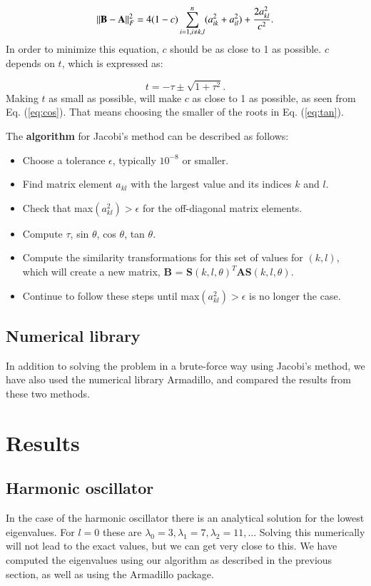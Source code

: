 \documentclass{article}
\begin{document}
\begin{multicols}{2}
\begin{equation*}
	||{\bf B}-{\bf A}||_F^2=4(1-c)\sum_{i=1,i\ne k,l}^n(a_{ik}^2+a_{il}^2) +\frac{2a_{kl}^2}{c^2}.
\end{equation*}
In order to minimize this equation, $c$ should be as close to 1 as possible. $c$ depends on $t$, which is expressed as: 

\begin{equation}\label{eq:tan}
	t = -\tau \pm \sqrt{1+\tau^2}.
\end{equation}
Making $t$ as small as possible, will make $c$ as close to 1 as possible, as seen from Eq. (\ref{eq:cos}). That means choosing the smaller of the roots in Eq. (\ref{eq:tan}).

The \textbf{algorithm} for Jacobi's method can be described as follows: 

\begin{itemize}
	\item Choose a tolerance $\epsilon$, typically $10^{-8}$ or smaller.
	\item Find matrix element $a_{kl}$ with the largest value and its indices $k$ and $l$.
	\item Check that max$(a_{kl}^2) > \epsilon$ for the off-diagonal matrix elements.
	\item Compute $\tau$, sin $\theta$, cos $\theta$, tan $\theta$.
	\item Compute the similarity transformations for this set of values for $(k,l)$, which will create a new matrix, \textbf{B} = \textbf{S}$(k,l,\theta)^T$\textbf{A}\textbf{S}$(k,l,\theta)$.
	\item Continue to follow these steps until max$(a_{kl}^2) > \epsilon$ is no longer the case.
\end{itemize}

\subsection{Numerical library}
In addition to solving the problem in a brute-force way using Jacobi's method, we have also used the numerical library Armadillo, and compared the results from these two methods.



\section{Results}
\subsection{Harmonic oscillator}
In the case of the harmonic oscillator there is an analytical solution for the lowest eigenvalues. For $l = 0$ these are $\lambda_0 = 3, \lambda_1 = 7, \lambda_2 = 11, \dots$ Solving this numerically will not lead to the exact values, but we can get very close to this. We have computed the eigenvalues using our algorithm as described in the previous section, as well as using the Armadillo package.


\end{multicols}
\end{document}
